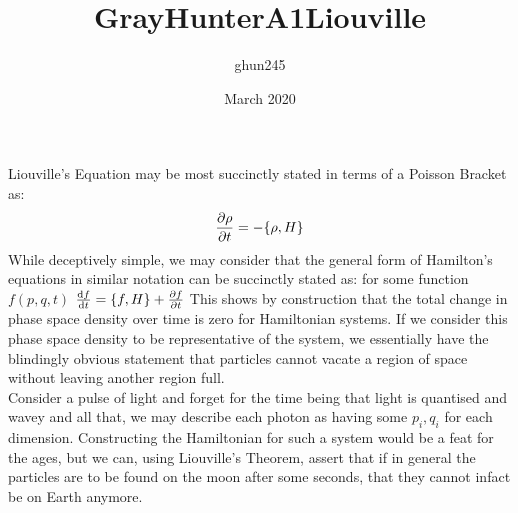 \documentclass{article}
\title{GrayHunterA1Liouville}
\author{ghun245 }
\date{March 2020}
\begin{document}
\maketitle

Liouville's Equation may be most succinctly stated in terms of a Poisson Bracket as:
$$
\pdv{\rho}{t} = -\{\rho,H\}
$$
While deceptively simple, we may consider that the general form of Hamilton's equations in similar notation can be succinctly stated as: for some function $f(p,q,t)$ $\dv{f}{t} = \{f,H \} + \pdv{f}{t}$ This shows by construction that the total change in phase space density over time is zero for Hamiltonian systems. If we consider this phase space density to be representative of the system, we essentially have the blindingly obvious statement that particles cannot vacate a region of space without leaving another region full. \\
Consider a pulse of light and forget for the time being that light is quantised and wavey and all that, we may describe each photon as having some $p_i, q_i$ for each dimension. Constructing the Hamiltonian for such a system would be a feat for the ages, but we can, using Liouville's Theorem, assert that if in general the particles are to be found on the moon after some seconds, that they cannot infact be on Earth anymore.
\end{document}
